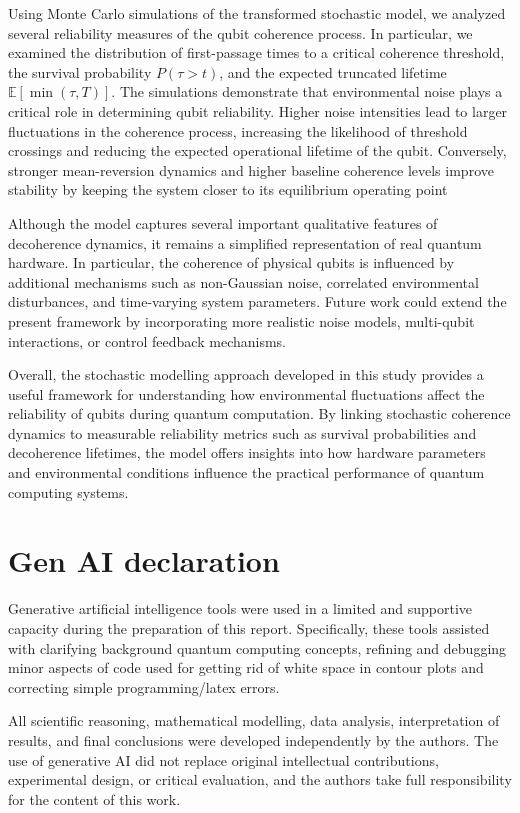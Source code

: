 \documentclass[
	a4paper, %
	10pt, %
	unnumberedsections, %
	twoside, %
]{LTJournalArticle}
\begin{document}
Using Monte Carlo simulations of the transformed stochastic model, we analyzed several reliability measures of the qubit coherence process. In particular, we examined the distribution of first-passage times to a critical coherence threshold, the survival probability $P(\tau > t)$, and the expected truncated lifetime $\mathbb{E}[\min(\tau,T)]$. The simulations demonstrate that environmental noise plays a critical role in determining qubit reliability. Higher noise intensities lead to larger fluctuations in the coherence process, increasing the likelihood of threshold crossings and reducing the expected operational lifetime of the qubit. Conversely, stronger mean-reversion dynamics and higher baseline coherence levels improve stability by keeping the system closer to its equilibrium operating point

Although the model captures several important qualitative features of decoherence dynamics, it remains a simplified representation of real quantum hardware. In particular, the coherence of physical qubits is influenced by additional mechanisms such as non-Gaussian noise, correlated environmental disturbances, and time-varying system parameters. Future work could extend the present framework by incorporating more realistic noise models, multi-qubit interactions, or control feedback mechanisms.

Overall, the stochastic modelling approach developed in this study provides a useful framework for understanding how environmental fluctuations affect the reliability of qubits during quantum computation. By linking stochastic coherence dynamics to measurable reliability metrics such as survival probabilities and decoherence lifetimes, the model offers insights into how hardware parameters and environmental conditions influence the practical performance of quantum computing systems.



\nocite{*}
\printbibliography %


\section{Gen AI declaration} 

Generative artificial intelligence tools were used in a limited and supportive capacity during the preparation of this report. Specifically, these tools assisted with clarifying background quantum computing concepts, refining and debugging minor aspects of code used for getting rid of white space in contour plots and correcting simple programming/latex errors.

All scientific reasoning, mathematical modelling, data analysis, interpretation of results, and final conclusions were developed independently by the authors. The use of generative AI did not replace original intellectual contributions, experimental design, or critical evaluation, and the authors take full responsibility for the content of this work.
\end{document}
